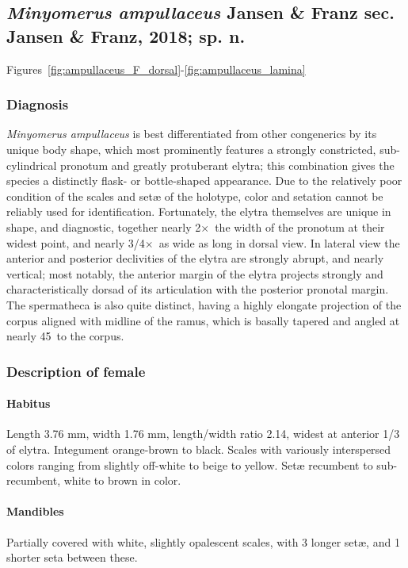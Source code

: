\documentclass[fleqn,10pt,lineno]{wlpeerj} %
\newcommand{\td}{\textdegree~}
\newcommand{\x}{$\times$~}
\begin{document}
	\subsection*{\textit{Minyomerus ampullaceus} Jansen \& Franz sec. Jansen \& Franz, 2018; sp. n.}\label{ssec:amp}
		Figures~\ref{fig:ampullaceus_F_dorsal}-\ref{fig:ampullaceus_lamina}
		\subsubsection*{Diagnosis}
			\textit{Minyomerus ampullaceus} is best differentiated from other congenerics by its unique body shape, which most prominently features a strongly constricted, sub-cylindrical pronotum and greatly protuberant elytra; this combination gives the species a distinctly flask- or bottle-shaped appearance.
			Due to the relatively poor condition of the scales and set{\ae} of the holotype, color and setation cannot be reliably used for identification.
			Fortunately, the elytra themselves are unique in shape, and diagnostic, together nearly 2\x the width of the pronotum at their widest point, and nearly 3/4\x as wide as long in dorsal view.
			In lateral view the anterior and posterior declivities of the elytra are strongly abrupt, and nearly vertical; most notably, the anterior margin of the elytra projects strongly and characteristically dorsad of its articulation with the posterior pronotal margin.
			The spermatheca is also quite distinct, having a highly elongate projection of the corpus aligned with midline of the ramus, which is basally tapered and angled at nearly 45\td to the corpus.
		\subsubsection*{Description of female}
			\paragraph{Habitus}
				Length 3.76 mm, width 1.76 mm, length/width ratio 2.14, widest at anterior 1/3 of elytra.
				Integument orange-brown to black. 
				Scales with variously interspersed colors ranging from slightly off-white to beige to yellow. 
				Set{\ae} recumbent to sub-recumbent, white to brown in color.
			\paragraph{Mandibles}
				Partially covered with white, slightly opalescent scales, with 3 longer set{\ae}, and 1 shorter seta between these.
\end{document}
